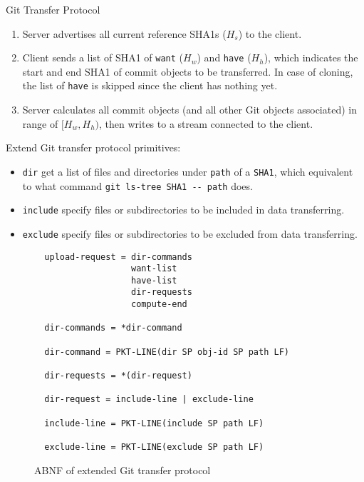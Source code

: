 \documentclass[final]{beamer}
\begin{document}
\begin{frame}[t, fragile]
\begin{columns}[t]
\begin{column}{.5\linewidth}
\begin{block}{Git Transfer Protocol}
\begin{enumerate}
  \item Server advertises all current reference SHA1s ($H_s$) to the client.

  \item Client sends a list of SHA1 of \verb|want| ($H_w$) and \verb|have|
    ($H_h$), which indicates the start and end SHA1 of commit objects to be
    transferred.
    In case of cloning, the list of \verb|have| is skipped since the client has
    nothing yet.

  \item Server calculates all commit objects (and all other Git objects
    associated) in range of $[H_w, H_h)$, then writes to a stream connected to
    the client.
\end{enumerate}

Extend Git transfer protocol primitives:

\begin{itemize}
    \justifying
  \item \verb|dir| get a list of files and directories under \verb|path| of a
    \verb|SHA1|, which equivalent to what command
    \verb|git ls-tree SHA1 -- path| does.

  \item \verb|include| specify files or subdirectories to be included in data
    transferring.

  \item \verb|exclude| specify files or subdirectories to be excluded from data
    transferring.
\end{itemize}
\begin{figure}[htpb]
  \centering
  \begin{verbatim}
  upload-request = dir-commands
                   want-list
                   have-list
                   dir-requests
                   compute-end

  dir-commands = *dir-command

  dir-command = PKT-LINE(dir SP obj-id SP path LF)

  dir-requests = *(dir-request)

  dir-request = include-line | exclude-line

  include-line = PKT-LINE(include SP path LF)

  exclude-line = PKT-LINE(exclude SP path LF)
  \end{verbatim}
  \caption{ABNF of extended Git transfer protocol}
  \label{fig:git-proto-ext-ABNF}
\end{figure}


\end{block}
\end{column}
\end{columns}
\end{frame}
\end{document}
